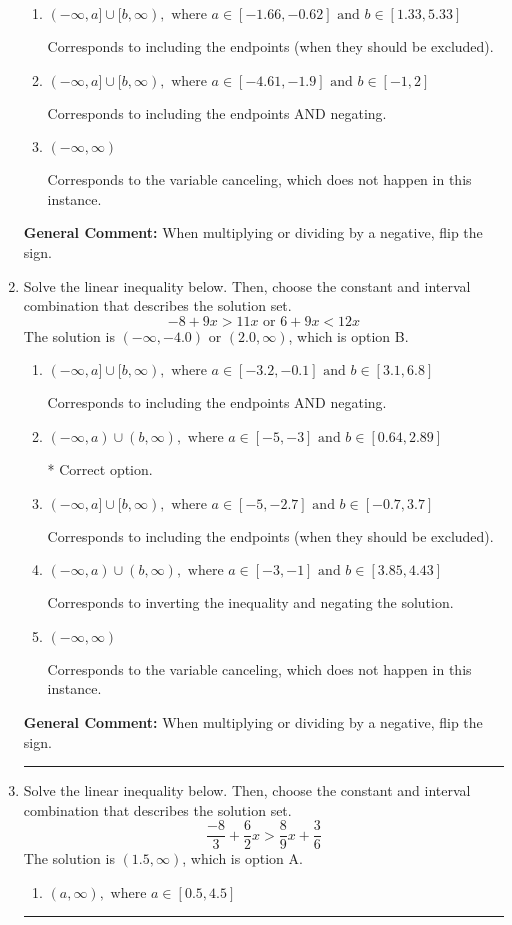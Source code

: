 \documentclass{extbook}[14pt]
\newcommand{\litem}[1]{\item #1

\rule{\textwidth}{0.4pt}}
\begin{document}
\begin{enumerate}
{\begin{enumerate}[label=\Alph*.]
Corresponds to inverting the inequality and negating the solution.
\item \( (-\infty, a] \cup [b, \infty), \text{ where } a \in [-1.66, -0.62] \text{ and } b \in [1.33, 5.33] \)

Corresponds to including the endpoints (when they should be excluded).
\item \( (-\infty, a] \cup [b, \infty), \text{ where } a \in [-4.61, -1.9] \text{ and } b \in [-1, 2] \)

Corresponds to including the endpoints AND negating.
\item \( (-\infty, \infty) \)

Corresponds to the variable canceling, which does not happen in this instance.
\end{enumerate}

\textbf{General Comment:} When multiplying or dividing by a negative, flip the sign.
}
\litem{
Solve the linear inequality below. Then, choose the constant and interval combination that describes the solution set.
\[ -8 + 9 x > 11 x \text{ or } 6 + 9 x < 12 x \]The solution is \( (-\infty, -4.0) \text{ or } (2.0, \infty) \), which is option B.\begin{enumerate}[label=\Alph*.]
\item \( (-\infty, a] \cup [b, \infty), \text{ where } a \in [-3.2, -0.1] \text{ and } b \in [3.1, 6.8] \)

Corresponds to including the endpoints AND negating.
\item \( (-\infty, a) \cup (b, \infty), \text{ where } a \in [-5, -3] \text{ and } b \in [0.64, 2.89] \)

 * Correct option.
\item \( (-\infty, a] \cup [b, \infty), \text{ where } a \in [-5, -2.7] \text{ and } b \in [-0.7, 3.7] \)

Corresponds to including the endpoints (when they should be excluded).
\item \( (-\infty, a) \cup (b, \infty), \text{ where } a \in [-3, -1] \text{ and } b \in [3.85, 4.43] \)

Corresponds to inverting the inequality and negating the solution.
\item \( (-\infty, \infty) \)

Corresponds to the variable canceling, which does not happen in this instance.
\end{enumerate}

\textbf{General Comment:} When multiplying or dividing by a negative, flip the sign.
}
\litem{
Solve the linear inequality below. Then, choose the constant and interval combination that describes the solution set.
\[ \frac{-8}{3} + \frac{6}{2} x > \frac{8}{9} x + \frac{3}{6} \]The solution is \( (1.5, \infty) \), which is option A.\begin{enumerate}[label=\Alph*.]
\item \( (a, \infty), \text{ where } a \in [0.5, 4.5] \)


\end{enumerate}}
\end{enumerate}
\end{document}

